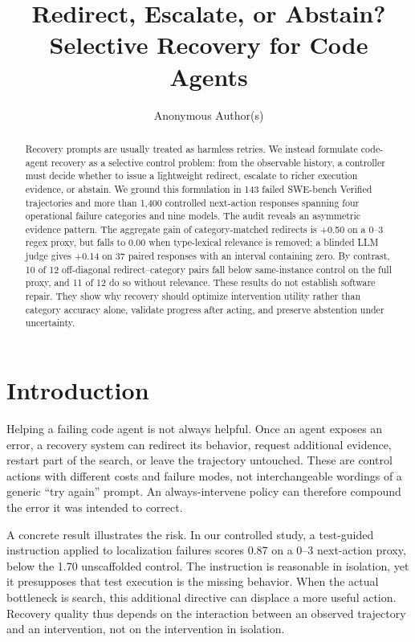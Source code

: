 \documentclass{article}
\title{Redirect, Escalate, or Abstain?\\Selective Recovery for Code Agents}
\author{Anonymous Author(s)}
\begin{document}
\maketitle

\begin{abstract}
Recovery prompts are usually treated as harmless retries.  We instead formulate
code-agent recovery as a selective control problem: from the observable history,
a controller must decide whether to issue a lightweight redirect, escalate to
richer execution evidence, or abstain.  We ground this formulation in 143 failed
SWE-bench Verified trajectories and more than 1,400 controlled next-action
responses spanning four operational failure categories and nine models.  The
audit reveals an asymmetric evidence pattern.  The aggregate gain of
category-matched redirects is +0.50 on a 0--3 regex proxy, but falls to 0.00
when type-lexical relevance is removed; a blinded LLM judge gives +0.14 on 37
paired responses with an interval containing zero.  By contrast, 10 of 12
off-diagonal redirect--category pairs fall below same-instance control on the
full proxy, and 11 of 12 do so without relevance.  These results do not
establish software repair.  They show why recovery should optimize
intervention utility rather than category accuracy alone, validate progress
after acting, and preserve abstention under uncertainty.
\end{abstract}

\section{Introduction}

Helping a failing code agent is not always helpful.  Once an agent exposes an
error, a recovery system can redirect its behavior, request additional evidence,
restart part of the search, or leave the trajectory untouched.  These are
control actions with different costs and failure modes, not interchangeable
wordings of a generic ``try again'' prompt.  An always-intervene policy can
therefore compound the error it was intended to correct.

A concrete result illustrates the risk.  In our controlled study, a
test-guided instruction applied to localization failures scores 0.87 on a 0--3
next-action proxy, below the 1.70 unscaffolded control.  The instruction is
reasonable in isolation, yet it presupposes that test execution is the missing
behavior.  When the actual bottleneck is search, this additional directive can
displace a more useful action.  Recovery quality thus depends on the
interaction between an observed trajectory and an intervention, not on the
intervention in isolation.
\end{document}
